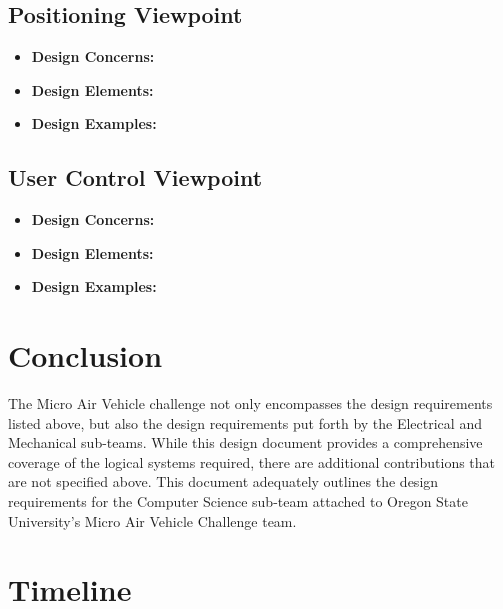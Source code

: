 \documentclass[onecolumn, draftclsnofoot,10pt, compsoc]{IEEEtran}
\begin{document}
\subsection{Positioning Viewpoint} %
\begin{itemize}
\item{ \textbf{Design Concerns:}}

\item{ \textbf{Design Elements:}}

\item{ \textbf{Design Examples:}} %

\end{itemize}



\subsection{User Control Viewpoint}%
\begin{itemize}
\item{ \textbf{Design Concerns:}}

\item{ \textbf{Design Elements:}}

\item{ \textbf{Design Examples:}} %

\end{itemize}


\section{Conclusion}

The Micro Air Vehicle challenge not only encompasses the design requirements listed above, but also the design requirements put forth by the Electrical and Mechanical sub-teams. While this design document provides a comprehensive coverage of the logical systems required, there are additional contributions that are not specified above. This document adequately outlines the design requirements for the Computer Science sub-team attached to Oregon State University's Micro Air Vehicle Challenge team. 





\newpage

\section{Timeline}
\end{document}
